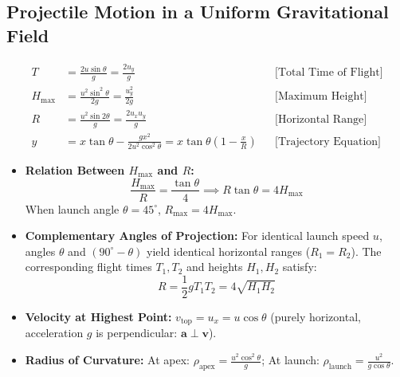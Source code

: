 \documentclass[11pt,a4paper]{article}
\begin{document}
\subsection{Projectile Motion in a Uniform Gravitational Field}

\begin{formulabox}
\begin{align}
  T &= \frac{2u\sin\theta}{g} = \frac{2u_y}{g} && \text{[Total Time of Flight]} \\
  H_{\max} &= \frac{u^2\sin^2\theta}{2g} = \frac{u_y^2}{2g} && \text{[Maximum Height]} \\
  R &= \frac{u^2\sin 2\theta}{g} = \frac{2u_x u_y}{g} && \text{[Horizontal Range]} \\
  y &= x\tan\theta - \frac{g x^2}{2u^2\cos^2\theta} = x\tan\theta\left(1 - \frac{x}{R}\right) && \text{[Trajectory Equation]}
\end{align}
\end{formulabox}

\begin{usecasebox}
\begin{itemize}
  \item \textbf{Relation Between $H_{\max}$ and $R$:}
  \begin{equation*}
    \frac{H_{\max}}{R} = \frac{\tan\theta}{4} \implies R\tan\theta = 4H_{\max}
  \end{equation*}
  When launch angle $\theta = 45^\circ$, $R_{\max} = 4H_{\max}$.
  \item \textbf{Complementary Angles of Projection:} For identical launch speed $u$, angles $\theta$ and $(90^\circ - \theta)$ yield identical horizontal ranges ($R_1 = R_2$). The corresponding flight times $T_1, T_2$ and heights $H_1, H_2$ satisfy:
  \begin{equation*}
    R = \frac{1}{2}g T_1 T_2 = 4\sqrt{H_1 H_2}
  \end{equation*}
  \item \textbf{Velocity at Highest Point:} $v_{\text{top}} = u_x = u\cos\theta$ (purely horizontal, acceleration $g$ is perpendicular: $\mathbf{a} \perp \mathbf{v}$).
  \item \textbf{Radius of Curvature:} At apex: $\rho_{\text{apex}} = \frac{u^2\cos^2\theta}{g}$; At launch: $\rho_{\text{launch}} = \frac{u^2}{g\cos\theta}$.
\end{itemize}
\end{usecasebox}
\end{document}
